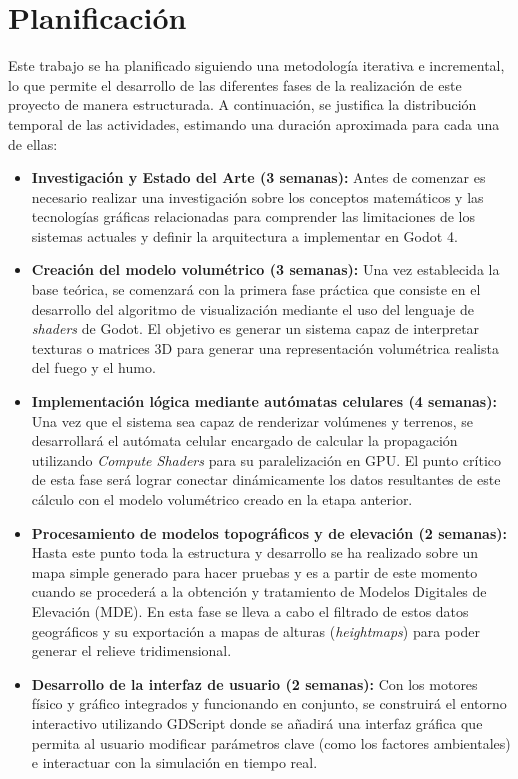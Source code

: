 \section{Planificación}
Este trabajo se ha planificado siguiendo una metodología iterativa e incremental, lo que permite el desarrollo de las diferentes fases de la realización de este proyecto de manera estructurada. A continuación, se justifica la distribución temporal de las actividades, estimando una duración aproximada para cada una de ellas:\\
\begin{itemize}
    \item \textbf{Investigación y Estado del Arte (3 semanas):} Antes de comenzar es necesario realizar una investigación sobre los conceptos matemáticos y las tecnologías gráficas relacionadas para comprender las limitaciones de los sistemas actuales y definir la arquitectura a implementar en Godot 4.

    \item \textbf{Creación del modelo volumétrico (3 semanas):} Una vez establecida la base teórica, se comenzará con la primera fase práctica que consiste en el desarrollo del algoritmo de visualización mediante el uso del lenguaje de \textit{shaders} de Godot. El objetivo es generar un sistema capaz de interpretar texturas o matrices 3D para generar una  representación volumétrica realista del fuego y el humo.

    \item \textbf{Implementación lógica mediante autómatas celulares (4 semanas):} Una vez que el sistema sea capaz de renderizar volúmenes y terrenos, se desarrollará el autómata celular encargado de calcular la propagación utilizando \textit{Compute Shaders} para su paralelización en GPU. El punto crítico de esta fase será lograr conectar dinámicamente los datos resultantes de este cálculo con el modelo volumétrico creado en la etapa anterior.

    \item \textbf{Procesamiento de modelos topográficos y de elevación (2 semanas):} Hasta este punto toda la estructura y desarrollo se ha realizado sobre un mapa simple generado para hacer pruebas y es a partir de este momento cuando se procederá a la obtención y tratamiento de Modelos Digitales de Elevación (MDE). En esta fase se lleva a cabo el filtrado de estos datos geográficos y su exportación a mapas de alturas (\textit{heightmaps}) para poder generar el relieve tridimensional.

    \item \textbf{Desarrollo de la interfaz de usuario (2 semanas):} Con los motores físico y gráfico integrados y funcionando en conjunto, se construirá el entorno interactivo utilizando GDScript donde se añadirá una interfaz gráfica que permita al usuario modificar parámetros clave (como los factores ambientales) e interactuar con la simulación en tiempo real.


\end{itemize}
